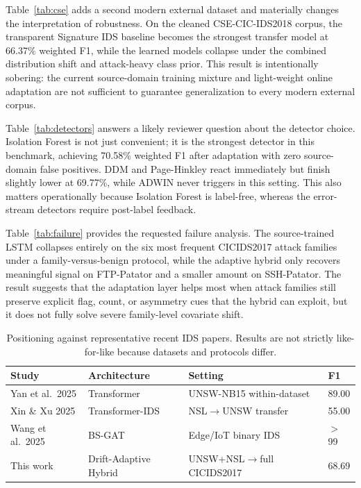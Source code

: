 \documentclass[conference]{IEEEtran}
\begin{document}
Table~\ref{tab:cse} adds a second modern external dataset and materially changes the interpretation of robustness. On the cleaned CSE-CIC-IDS2018 corpus, the transparent Signature IDS baseline becomes the strongest transfer model at 66.37\% weighted F1, while the learned models collapse under the combined distribution shift and attack-heavy class prior. This result is intentionally sobering: the current source-domain training mixture and light-weight online adaptation are not sufficient to guarantee generalization to every modern external corpus.

Table~\ref{tab:detectors} answers a likely reviewer question about the detector choice. Isolation Forest is not just convenient; it is the strongest detector in this benchmark, achieving 70.58\% weighted F1 after adaptation with zero source-domain false positives. DDM and Page-Hinkley react immediately but finish slightly lower at 69.77\%, while ADWIN never triggers in this setting. This also matters operationally because Isolation Forest is label-free, whereas the error-stream detectors require post-label feedback.

Table~\ref{tab:failure} provides the requested failure analysis. The source-trained LSTM collapses entirely on the six most frequent CICIDS2017 attack families under a family-versus-benign protocol, while the adaptive hybrid only recovers meaningful signal on FTP-Patator and a smaller amount on SSH-Patator. The result suggests that the adaptation layer helps most when attack families still preserve explicit flag, count, or asymmetry cues that the hybrid can exploit, but it does not fully solve severe family-level covariate shift.

\begin{table}[t]
\caption{Positioning against representative recent IDS papers. Results are not strictly like-for-like because datasets and protocols differ.}
\label{tab:sota}
\centering
\scriptsize
\begin{tabular}{@{}p{1.2cm}p{1.55cm}p{1.55cm}p{0.8cm}@{}}
\toprule
Study & Architecture & Setting & F1 \\
\midrule
Yan et al.\ 2025 & Transformer & UNSW-NB15 within-dataset & 89.00 \\
Xin \& Xu 2025 & Transformer-IDS & NSL$\rightarrow$UNSW transfer & 55.00 \\
Wang et al.\ 2025 & BS-GAT & Edge/IoT binary IDS & $>$99 \\
This work & Drift-Adaptive Hybrid & UNSW+NSL$\rightarrow$full CICIDS2017 & 68.69 \\
\bottomrule
\end{tabular}
\end{table}
\end{document}
